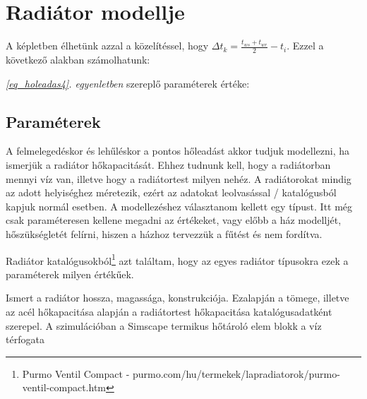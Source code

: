 
\section{Radiátor modellje}

A képletben élhetünk azzal a közelítéssel, hogy $\Delta t_k=\frac{t_{ws}+t_{wr}}{2}-t_i$. Ezzel a következő alakban számolhatunk:

\textit{\ref{eq_holeadas4}. egyenletben} szereplő paraméterek értéke:

\subsection{Paraméterek}
A felmelegedéskor és lehűléskor a pontos hőleadást akkor tudjuk modellezni, ha ismerjük a radiátor hőkapacitását. Ehhez tudnunk kell, hogy a radiátorban mennyi víz van, illetve hogy a radiátortest milyen nehéz.
A radiátorokat mindig az adott helyiséghez méretezik, ezért az adatokat leolvasással / katalógusból kapjuk normál esetben. A modellezéshez választanom kellett egy típust. Itt még csak paraméteresen kellene megadni az értékeket, vagy előbb a ház modelljét, hőszükségletét felírni, hiszen a házhoz tervezzük a fűtést és nem fordítva.

Radiátor katalógusokból\footnote{Purmo Ventil Compact - purmo.com/hu/termekek/lapradiatorok/purmo-ventil-compact.htm} azt találtam, hogy az egyes radiátor típusokra ezek a paraméterek milyen értékűek.




Ismert a radiátor hossza, magassága, konstrukciója. Ezalapján a
tömege, illetve az acél hőkapacitása alapján a radiátortest hőkapacitása katalógusadatként szerepel.
A szimulációban a  Simscape termikus hőtároló elem blokk a víz térfogata%


